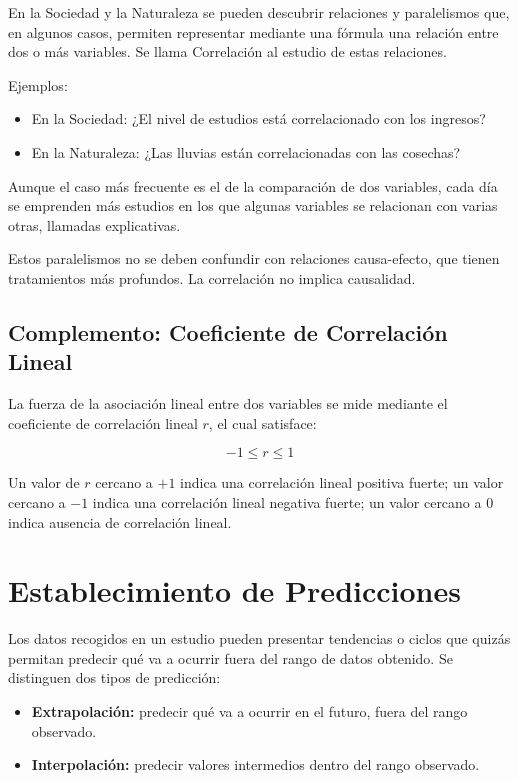 En la Sociedad y la Naturaleza se pueden descubrir relaciones y paralelismos que, en algunos casos, permiten representar mediante una fórmula una relación entre dos o más variables. Se llama Correlación al estudio de estas relaciones.

Ejemplos:
\begin{itemize}
    \item En la Sociedad: ¿El nivel de estudios está correlacionado con los ingresos?
    \item En la Naturaleza: ¿Las lluvias están correlacionadas con las cosechas?
\end{itemize}

Aunque el caso más frecuente es el de la comparación de dos variables, cada día se emprenden más estudios en los que algunas variables se relacionan con varias otras, llamadas explicativas.

Estos paralelismos no se deben confundir con relaciones causa-efecto, que tienen tratamientos más profundos. La correlación no implica causalidad.

\subsection{Complemento: Coeficiente de Correlación Lineal}
La fuerza de la asociación lineal entre dos variables se mide mediante el coeficiente de correlación lineal $r$, el cual satisface:

$$-1 \leq r \leq 1$$

Un valor de $r$ cercano a $+1$ indica una correlación lineal positiva fuerte; un valor cercano a $-1$ indica una correlación lineal negativa fuerte; un valor cercano a $0$ indica ausencia de correlación lineal.

\section{Establecimiento de Predicciones}

Los datos recogidos en un estudio pueden presentar tendencias o ciclos que quizás permitan predecir qué va a ocurrir fuera del rango de datos obtenido. Se distinguen dos tipos de predicción:

\begin{itemize}
    \item \textbf{Extrapolación:} predecir qué va a ocurrir en el futuro, fuera del rango observado.
    \item \textbf{Interpolación:} predecir valores intermedios dentro del rango observado.
\end{itemize}

